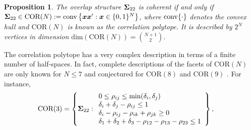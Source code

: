 \documentclass[12pt]{article}
\newcommand{\COR}{\text{COR}}
\newtheorem{proposition}[theorem]{Proposition}
\theoremstyle{definition}
\theoremstyle{definition}
\def\conv{{\rm conv}}
\begin{document}
\begin{proposition}
\label{CorrelationPolytope}
The overlap structure ${\bf\Sigma}_{22}$ is coherent if and only
if 
${\bf\Sigma}_{22} \in \COR(N) := \conv\left\{
\boldsymbol{x}\boldsymbol{x}' : \boldsymbol{x} \in
\{0,1\}^N\right\}$,
where $\conv\{\cdot\}$ denotes the convex hull and $\COR(N)$ is known as the correlation
polytope. It is described by $2^N$
vertices in dimension $\text{dim}(\COR(N)) = \binom{N+1}{2}$.
\end{proposition}
The correlation polytope has a very complex description in terms of a finite
number of half-spaces. In fact, complete descriptions of the facets of $\COR(N)$ are only known for $N \leq 7$ and conjectured for  $\COR(8)$ and $\COR(9)$ 
\citep{ziegler2000lectures}. For instance, 
\begin{align*}
\COR(3) &= 
\left\{ {\bf\Sigma}_{22} : 
\begin{array}{ll}
 0 \leq \rho_{ij} \leq \min(\delta_i, \delta_j)\\
 \delta_i + \delta_j - \rho_{ij} \leq 1\\
 \delta_i - \rho_{ij} - \rho_{ik} + \rho_{jk} \geq 0\\
 \delta_1 + \delta_2 + \delta_3 - \rho_{12} - \rho_{13} - \rho_{23} \leq 1
\end{array}
\right\},
\end{align*}
\end{document}
